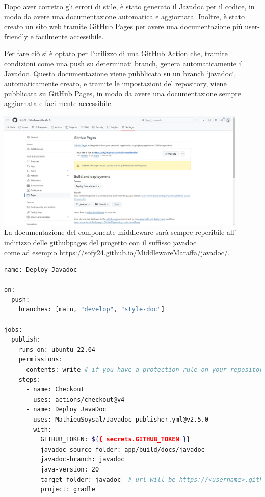 Dopo aver corretto gli errori di stile, è stato generato il Javadoc per il codice, in modo da avere una documentazione automatica e aggiornata. Inoltre, è stato creato un sito web tramite GitHub Pages per avere una documentazione più user-friendly e facilmente accessibile. 

Per fare ciò si è optato per l'utilizzo di una GitHub Action che, tramite condizioni come una push su determinati branch, genera automaticamente il Javadoc. Questa documentazione viene pubblicata su un branch `javadoc`, automaticamente creato, e tramite le impostazioni del repository, viene pubblicata su GitHub Pages, in modo da avere una documentazione sempre aggiornata e facilmente accessibile.

\includegraphics[width=12cm]{report/img/github_javadoc.jpg}\\[1.5cm]

La documentazione del componente middleware sarà sempre reperibile
all' indirizzo delle githubpages del progetto con il suffisso javadoc \\ come ad esempio \href{https://sofy24.github.io/MiddlewareMaraffa/javadoc/}{\underline{https://sofy24.github.io/MiddlewareMaraffa/javadoc/}}.

\begin{lstlisting}[language=Bash, caption={Configurazione della GitHub Action per il Javadoc}, label=list:javadoc_action]
name: Deploy Javadoc

on:
  push:
    branches: [main, "develop", "style-doc"]

jobs:
  publish:
    runs-on: ubuntu-22.04
    permissions:
      contents: write # if you have a protection rule on your repository, you'll need to give write permission to the workflow.
    steps:
      - name: Checkout
        uses: actions/checkout@v4
      - name: Deploy JavaDoc
        uses: MathieuSoysal/Javadoc-publisher.yml@v2.5.0
        with:
          GITHUB_TOKEN: ${{ secrets.GITHUB_TOKEN }}
          javadoc-source-folder: app/build/docs/javadoc
          javadoc-branch: javadoc
          java-version: 20
          target-folder: javadoc  # url will be https://<username>.github.io/<repo>/javadoc, This can be left as nothing to generate javadocs in the root folder.
          project: gradle
\end{lstlisting}

